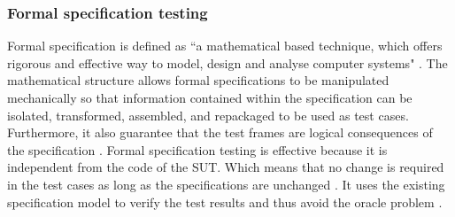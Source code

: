 \subsubsection{Formal specification testing}
Formal specification is defined as ``a mathematical based technique, which offers rigorous and effective way to model, design and analyse computer systems" \cite{formal1997specification, Hierons2009}. The mathematical structure allows formal specifications to be manipulated mechanically so that information contained within the specification can be isolated, transformed, assembled, and repackaged to be used as test cases. Furthermore, it also guarantee that the test frames are logical consequences of the specification \cite{donat1997automating}. Formal specification testing is effective because it is independent from the code of the SUT. Which means that no change is required in the test cases as long as the specifications are unchanged \cite{gaudel2010software}. It uses the existing specification model to verify the test results and thus avoid the oracle problem \cite{bertolino2007software}.









